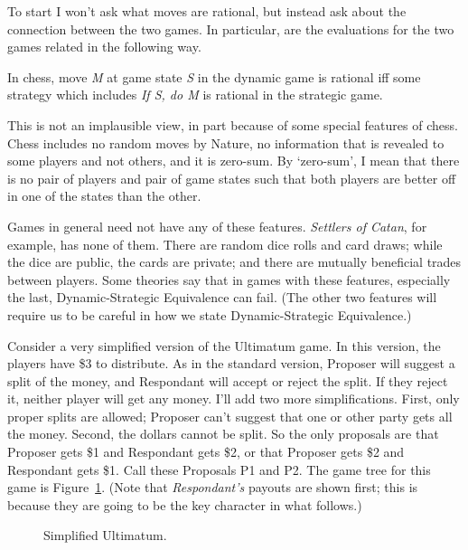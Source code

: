 \documentclass[
  10pt,
  letterpaper,
  DIV=11,
  numbers=noendperiod,
  twoside]{scrartcl}
\providecommand{\tightlist}{%
  \setlength{\itemsep}{0pt}\setlength{\parskip}{0pt}}\usepackage{longtable,booktabs,array}
\begin{document}
To start I won't ask what moves are rational, but instead ask about the
connection between the two games. In particular, are the evaluations for
the two games related in the following way.

\begin{description}
\tightlist
\item[Dynamic-Strategic Equivalance (for chess)]
In chess, move \emph{M} at game state \emph{S} in the dynamic game is
rational iff some strategy which includes \emph{If S, do M} is rational
in the strategic game.
\end{description}

This is not an implausible view, in part because of some special
features of chess. Chess includes no random moves by Nature, no
information that is revealed to some players and not others, and it is
zero-sum. By `zero-sum', I mean that there is no pair of players and
pair of game states such that both players are better off in one of the
states than the other.

Games in general need not have any of these features. \emph{Settlers of
Catan}, for example, has none of them. There are random dice rolls and
card draws; while the dice are public, the cards are private; and there
are mutually beneficial trades between players. Some theories say that
in games with these features, especially the last, Dynamic-Strategic
Equivalence can fail. (The other two features will require us to be
careful in how we state Dynamic-Strategic Equivalence.)

Consider a very simplified version of the Ultimatum game. In this
version, the players have \$3 to distribute. As in the standard version,
Proposer will suggest a split of the money, and Respondant will accept
or reject the split. If they reject it, neither player will get any
money. I'll add two more simplifications. First, only proper splits are
allowed; Proposer can't suggest that one or other party gets all the
money. Second, the dollars cannot be split. So the only proposals are
that Proposer gets \$1 and Respondant gets \$2, or that Proposer gets
\$2 and Respondant gets \$1. Call these Proposals P1 and P2. The game
tree for this game is Figure~\ref{fig-ultimatum}. (Note that
\emph{Respondant's} payouts are shown first; this is because they are
going to be the key character in what follows.)

\begin{figure}


\caption{\label{fig-ultimatum}Simplified Ultimatum.}

\end{figure}%
\end{document}
